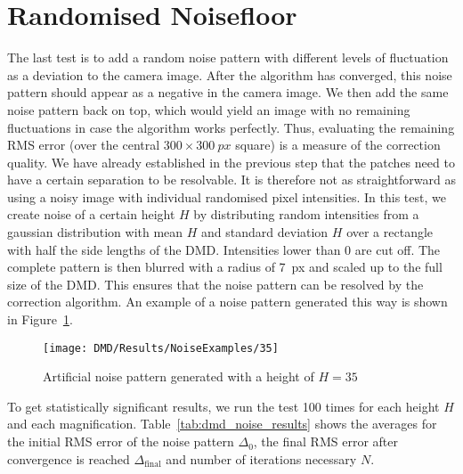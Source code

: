 \section{Randomised Noisefloor}
The last test is to add a random noise pattern with different levels of fluctuation as a deviation to the camera image. After the algorithm has converged, this noise pattern should appear as a negative in the camera image. We then add the same noise pattern back on top, which would yield an image with no remaining fluctuations in case the algorithm works perfectly. Thus, evaluating the remaining RMS error (over the central $300\times \SI{300}{px}$ square) is a measure of the correction quality. We have already established in the previous step that the patches need to have a certain separation to be resolvable. It is therefore not as straightforward as using a noisy image with individual randomised pixel intensities. In this test, we create noise of a certain height $H$ by distributing random intensities from a gaussian distribution with mean $H$ and standard deviation $H$ over a rectangle with half the side lengths of the DMD. Intensities lower than 0 are cut off. The complete pattern is then blurred with a radius of \SI{7}{px} and scaled up to the full size of the DMD. This ensures that the noise pattern can be resolved by the correction algorithm. An example of a noise pattern generated this way is shown in Figure~\ref{fig:dmd_noise_example}.
\begin{figure}[htbp]
    \centering
    \texttt{[image: DMD/Results/NoiseExamples/35]}
    \caption{Artificial noise pattern generated with a height of $H=35$}
    \label{fig:dmd_noise_example}
\end{figure}
To get statistically significant results, we run the test 100 times for each height $H$ and each magnification.
%
Table~\ref{tab:dmd_noise_results} shows the averages for the initial RMS error of the noise pattern $\Delta_0$, the final RMS error after convergence is reached $\Delta_\text{final}$ and number of iterations necessary $N$. 
